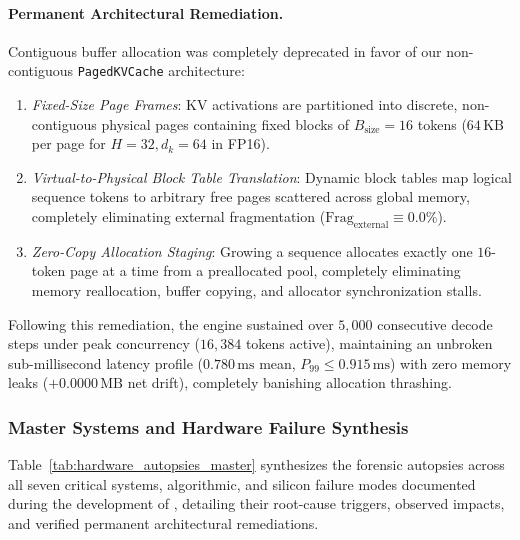 \paragraph{Permanent Architectural Remediation.}
Contiguous buffer allocation was completely deprecated in favor of our non-contiguous \texttt{PagedKVCache} architecture:
\begin{enumerate}
    \item \emph{Fixed-Size Page Frames}: KV activations are partitioned into discrete, non-contiguous physical pages containing fixed blocks of $B_{\text{size}} = 16$ tokens ($64\,\text{KB}$ per page for $H=32, d_k=64$ in FP16).
    \item \emph{Virtual-to-Physical Block Table Translation}: Dynamic block tables map logical sequence tokens to arbitrary free pages scattered across global memory, completely eliminating external fragmentation ($\text{Frag}_{\text{external}} \equiv 0.0\%$).
    \item \emph{Zero-Copy Allocation Staging}: Growing a sequence allocates exactly one $16$-token page at a time from a preallocated pool, completely eliminating memory reallocation, buffer copying, and allocator synchronization stalls.
\end{enumerate}
Following this remediation, the engine sustained over $5{,}000$ consecutive decode steps under peak concurrency ($16{,}384$ tokens active), maintaining an unbroken sub-millisecond latency profile ($0.780\,\text{ms}$ mean, $P_{99} \le 0.915\,\text{ms}$) with zero memory leaks ($+0.0000\,\text{MB}$ net drift), completely banishing allocation thrashing.

\subsubsection{Master Systems and Hardware Failure Synthesis}
\label{sec:ablations_autopsy_summary}

Table~\ref{tab:hardware_autopsies_master} synthesizes the forensic autopsies across all seven critical systems, algorithmic, and silicon failure modes documented during the development of \neuralops{}, detailing their root-cause triggers, observed impacts, and verified permanent architectural remediations.


